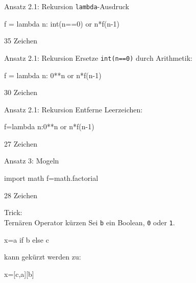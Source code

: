 \documentclass[xcolor=dvipsnames, aspectratio=43, 14pt]{beamer}
\begin{document}
\begin{frame}[fragile]{Ansatz 2.1: Rekursion}
	\texttt{lambda}-Ausdruck
	
	\vfill
	
	\begin{python3code}
	f = lambda n: int(n==0) or n*f(n-1)
	\end{python3code}
	
	\vfill
	
	35 Zeichen
\end{frame}

\begin{frame}[fragile]{Ansatz 2.1: Rekursion}
	Ersetze \texttt{int(n==0)} durch Arithmetik:
	
	\vfill
	
	\begin{python3code}
	f = lambda n: 0**n or n*f(n-1)
	\end{python3code}
	
	\vfill
	
	30 Zeichen
\end{frame}

\begin{frame}[fragile]{Ansatz 2.1: Rekursion}
	Entferne Leerzeichen:
	
	\vfill
	
	\begin{python3code}
	f=lambda n:0**n or n*f(n-1)
	\end{python3code}
	
	\vfill
	
	27 Zeichen
\end{frame}

\begin{frame}[fragile]{Ansatz 3: Mogeln}
	\begin{python3code}
	import math
	f=math.factorial
	\end{python3code}
	
	\vfill
	
	28 Zeichen
\end{frame}

\begin{frame}[fragile]{Trick:\\ Ternären Operator kürzen}
	Sei \texttt{b} ein Boolean, \texttt{0} oder \texttt{1}.
	
	\vfill
	
	\begin{python3code}
	x=a if b else c
	\end{python3code}
	
	\vfill
	
	kann gekürzt werden zu:
	
	\vfill
	
	\begin{python3code}
	x=[c,a][b]
	\end{python3code}
\end{frame}
\end{document}
